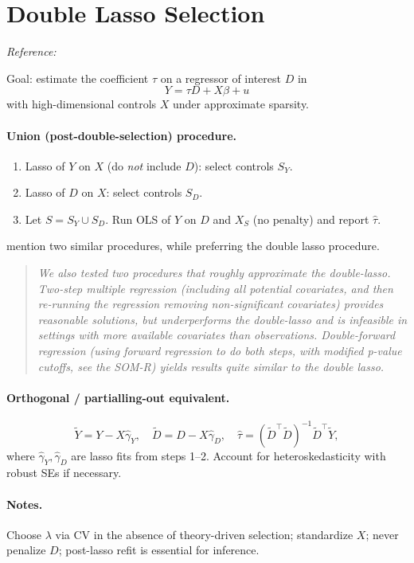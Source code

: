 \section{Double Lasso Selection}

\emph{Reference: \cite{urminsky2016using}}

Goal: estimate the coefficient $\tau$ on a regressor of interest $D$ in
\[
Y=\tau D + X\beta + u
\]
with high-dimensional controls $X$ under approximate sparsity.

\paragraph{Union (post-double-selection) procedure.}
\begin{enumerate}
\item Lasso of $Y$ on $X$ (do \emph{not} include $D$): select controls $S_Y$.
\item Lasso of $D$ on $X$: select controls $S_D$.
\item Let $S=S_Y\cup S_D$. Run OLS of $Y$ on $D$ and $X_S$ (no penalty) and report $\hat\tau$.
\end{enumerate}

\cite{urminsky2016using} mention two similar procedures, while preferring the double lasso procedure. 

\begin{quotation}
\emph{We also tested two procedures that roughly approximate the double-lasso. Two-step
multiple regression (including all potential covariates, and then re-running the regression
removing non-significant covariates) provides reasonable solutions, but underperforms the
double-lasso and is infeasible in settings with more available covariates than observations.
Double-forward regression (using forward regression to do both steps, with modified p-value
cutoffs, see the SOM-R) yields results quite similar to the double lasso.}
\end{quotation}


\paragraph{Orthogonal / partialling-out equivalent.}
\[
\tilde Y=Y-X\hat\gamma_Y,\quad \tilde D=D-X\hat\gamma_D,\quad
\hat\tau=(\tilde D^\top \tilde D)^{-1}\tilde D^\top \tilde Y,
\]
where $\hat\gamma_Y,\hat\gamma_D$ are lasso fits from steps 1--2. Account for heteroskedasticity with robust SEs if necessary.

\paragraph{Notes.}
Choose $\lambda$ via CV in the absence of theory-driven selection; standardize $X$; never penalize $D$; post-lasso refit is essential for inference.


